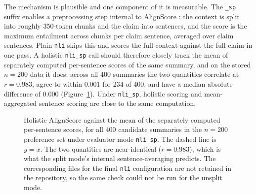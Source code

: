 The mechanism is plausible and one component of it is measurable. The
\texttt{\_sp} suffix enables a preprocessing step internal to AlignScore
\citep{zha2023alignscore}: the context is split into roughly 350-token chunks and
the claim into sentences, and the score is the maximum entailment across chunks
per claim sentence, averaged over claim sentences. Plain \texttt{nli} skips this
and scores the full context against the full claim in one pass. A holistic
\texttt{nli\_sp} call should therefore closely track the mean of separately
computed per-sentence scores of the same summary, and on the stored $n=200$ data
it does: across all 400 summaries the two quantities correlate at $r=0.983$,
agree to within $0.001$ for 234 of 400, and have a median absolute difference of
$0.000$ (Figure~\ref{fig:mean-vs-holistic}). Under \texttt{nli\_sp}, holistic
scoring and mean-aggregated sentence scoring are close to the same computation.

\begin{figure}[htbp]
\centering
{}
\caption[Holistic score vs.\ mean of per-sentence scores]{Holistic AlignScore against the mean of the separately computed
per-sentence scores, for all 400 candidate summaries in the $n=200$ preference
set under evaluator mode \texttt{nli\_sp}. The dashed line is $y=x$. The two
quantities are near-identical ($r = 0.983$), which is what the split mode's
internal sentence-averaging predicts. The corresponding files for the final
\texttt{nli} configuration are not retained in the repository, so the same check
could not be run for the unsplit mode.}
\label{fig:mean-vs-holistic}
\end{figure}


